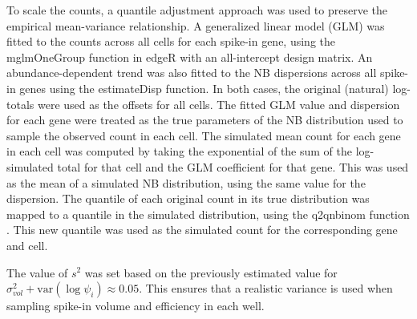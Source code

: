 \documentclass{article}
\begin{document}
To scale the counts, a quantile adjustment approach was used to preserve the empirical mean-variance relationship.
A generalized linear model (GLM) was fitted to the counts across all cells for each spike-in gene, using the mglmOneGroup function in edgeR \cite{mccarthy2012differential, robinson2010edgeR} with an all-intercept design matrix.
An abundance-dependent trend was also fitted to the NB dispersions across all spike-in genes using the estimateDisp function.
In both cases, the original (natural) log-totals were used as the offsets for all cells.
The fitted GLM value and dispersion for each gene were treated as the true parameters of the NB distribution used to sample the observed count in each cell.
The simulated mean count for each gene in each cell was computed by taking the exponential of the sum of the log-simulated total for that cell and the GLM coefficient for that gene.
This was used as the mean of a simulated NB distribution, using the same value for the dispersion.
The quantile of each original count in its true distribution was mapped to a quantile in the simulated distribution, using the q2qnbinom function \cite{robinson2008small}.
This new quantile was used as the simulated count for the corresponding gene and cell.



The value of $s^2$ was set based on the previously estimated value for $\sigma^2_{vol} + \mbox{var}(\log \psi_{i}) \approx 0.05$.
This ensures that a realistic variance is used when sampling spike-in volume and efficiency in each well.
\end{document}
